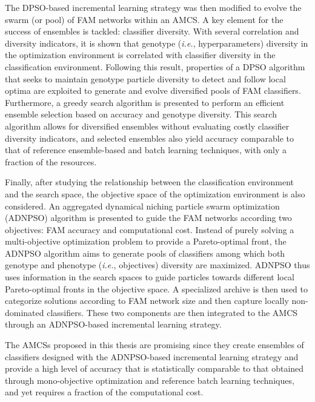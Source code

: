The DPSO-based incremental learning strategy was then modified to evolve the swarm (or pool) of FAM networks within an AMCS.
A key element for the success of ensembles is tackled: classifier diversity. With several correlation and diversity indicators, it is shown that genotype (\emph{i.e.}, hyperparameters) diversity in the optimization environment is correlated with classifier diversity in the classification environment. Following this result, properties of a DPSO algorithm that seeks to maintain genotype particle diversity to detect and follow local optima are exploited to generate and evolve diversified pools of FAM classifiers. Furthermore, a greedy search algorithm is presented to perform an efficient ensemble selection based on accuracy and genotype diversity.
This search algorithm allows for diversified ensembles without evaluating costly classifier diversity indicators, and selected ensembles also yield accuracy comparable to that of reference ensemble-based and batch learning techniques, with only a fraction of the resources.

Finally, after studying the relationship between the classification environment and the search space, the objective space of the optimization environment is also considered.
An aggregated dynamical niching particle swarm optimization (ADNPSO) algorithm is presented to guide the FAM networks according two objectives: FAM accuracy and computational cost.
Instead of purely solving a multi-objective optimization problem to provide a Pareto-optimal front, the ADNPSO algorithm aims to generate pools of classifiers among which both genotype and phenotype (\emph{i.e.}, objectives) diversity are maximized.
ADNPSO thus uses information in the search spaces to guide particles towards different local Pareto-optimal fronts in the objective space.
A specialized archive is then used to categorize solutions according to FAM network size and then capture locally non-dominated classifiers.
These two components are then integrated to the AMCS through an ADNPSO-based incremental learning strategy. 

The AMCSs proposed in this thesis are promising since they create ensembles of classifiers designed with the ADNPSO-based incremental learning strategy and provide a high level of accuracy that is statistically comparable to that obtained through mono-objective optimization and reference batch learning techniques, and yet requires a fraction of the computational cost.